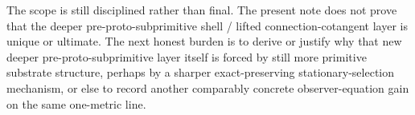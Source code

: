 \documentclass[11pt]{article}
\begin{document}
The scope is still disciplined rather than final. The present note does not prove that the deeper pre-proto-subprimitive shell / lifted connection-cotangent layer is unique or ultimate. The next honest burden is to derive or justify why that new deeper pre-proto-subprimitive layer itself is forced by still more primitive substrate structure, perhaps by a sharper exact-preserving stationary-selection mechanism, or else to record another comparably concrete observer-equation gain on the same one-metric line.
\end{document}
